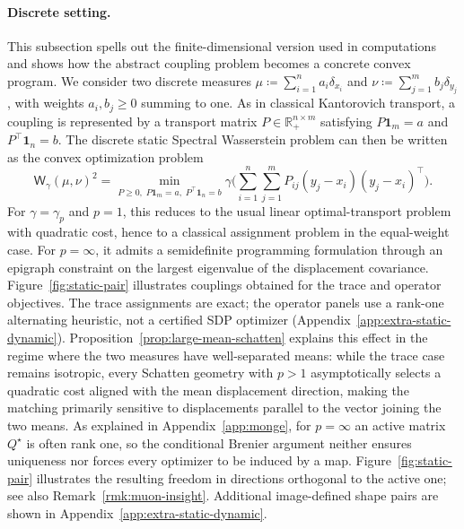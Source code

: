 \documentclass{article}
\newcommand{\R}{\mathbb{R}}
\newcommand{\Wg}{\mathsf{W}_{\gamma}}
\begin{document}
\paragraph{Discrete setting.}
This subsection spells out the finite-dimensional version used in computations and shows how the abstract coupling problem becomes a concrete convex program. We consider two discrete measures $\mu\coloneqq\sum_{i=1}^n a_i\delta_{x_i}$ and $\nu\coloneqq\sum_{j=1}^m b_j\delta_{y_j}$, with weights $a_i,b_j\ge 0$ summing to one. As in classical Kantorovich transport, a coupling is represented by a transport matrix $P\in\R_+^{n\times m}$ satisfying $P\mathbf 1_m=a$ and $P^\top\mathbf 1_n=b$. The discrete static Spectral Wasserstein problem can then be written as the convex optimization problem
$$
\Wg(\mu,\nu)^2=
\min_{P\ge 0,\;P\mathbf 1_m=a,\;P^\top\mathbf 1_n=b}
\gamma\!\big(
\sum_{i=1}^n\sum_{j=1}^m P_{ij}(y_j-x_i)(y_j-x_i)^\top
\big).
$$
For $\gamma=\gamma_p$ and $p=1$, this reduces to the usual linear
optimal-transport problem with quadratic cost, hence to a classical assignment
problem in the equal-weight case. For $p=\infty$, it admits a semidefinite
programming formulation through an epigraph constraint on the largest
eigenvalue of the displacement covariance.
%
Figure~\ref{fig:static-pair} illustrates couplings obtained for the trace and
operator objectives. The trace assignments are exact; the operator panels
use a rank-one alternating heuristic, not a certified SDP optimizer
(Appendix~\ref{app:extra-static-dynamic}). Proposition~\ref{prop:large-mean-schatten}
explains this effect in the regime where the two measures have well-separated
means: while the trace case remains isotropic, every Schatten geometry with
$p>1$ asymptotically selects a quadratic cost aligned with the mean
displacement direction, making the matching primarily sensitive to
displacements parallel to the vector joining the two means.
%
As explained in Appendix~\ref{app:monge}, for $p=\infty$ an active matrix
$Q^\star$ is often rank one, so the conditional Brenier argument neither
ensures uniqueness nor forces every optimizer to be induced by a map.
Figure~\ref{fig:static-pair} illustrates the resulting freedom in directions
orthogonal to the active one; see also Remark~\ref{rmk:muon-insight}.
%
Additional image-defined shape pairs are shown in Appendix~\ref{app:extra-static-dynamic}.
\end{document}
